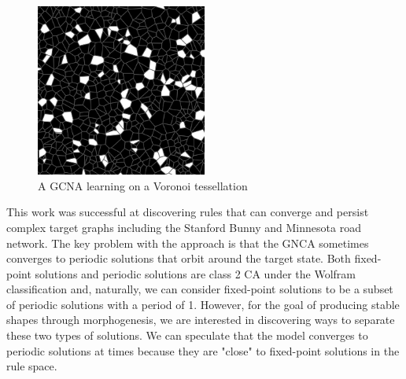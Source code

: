 \begin{figure}[!h]
    \centering
    \includegraphics[width=0.5\textwidth]{images/voronoi.png}
    \caption{A GCNA learning on a Voronoi tessellation \cite{grattarola2021learning}}
    \label{fig:voronoi}
\end{figure}

This work was successful at discovering rules that can converge and persist complex target graphs including the Stanford Bunny \cite{turk} and Minnesota road network.
The key problem with the approach is that the GNCA sometimes converges to periodic solutions that orbit around the target state. 
Both fixed-point solutions and periodic solutions are class 2 CA under the Wolfram classification and, naturally, we can consider fixed-point solutions to be a subset of periodic solutions with a period of 1.
However, for the goal of producing stable shapes through morphogenesis, we are interested in discovering ways to separate these two types of solutions.
We can speculate that the model converges to periodic solutions at times because they are "close" to fixed-point solutions in the rule space.